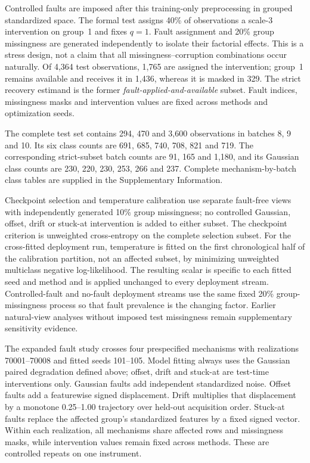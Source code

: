 \documentclass[11pt]{article}
\begin{document}
Controlled faults are imposed after this training-only preprocessing in grouped standardized space. The formal test assigns 40\% of observations a scale-3 intervention on group~1 and fixes $q=1$. Fault assignment and 20\% group missingness are generated independently to isolate their factorial effects. This is a stress design, not a claim that all missingness--corruption combinations occur naturally. Of 4,364 test observations, 1,765 are assigned the intervention; group~1 remains available and receives it in 1,436, whereas it is masked in 329. The strict recovery estimand is the former \emph{fault-applied-and-available} subset. Fault indices, missingness masks and intervention values are fixed across methods and optimization seeds.

The complete test set contains 294, 470 and 3,600 observations in batches 8, 9 and 10. Its six class counts are 691, 685, 740, 708, 821 and 719. The corresponding strict-subset batch counts are 91, 165 and 1,180, and its Gaussian class counts are 230, 220, 230, 253, 266 and 237. Complete mechanism-by-batch class tables are supplied in the Supplementary Information.

Checkpoint selection and temperature calibration use separate fault-free views with independently generated 10\% group missingness; no controlled Gaussian, offset, drift or stuck-at intervention is added to either subset. The checkpoint criterion is unweighted cross-entropy on the complete selection subset. For the cross-fitted deployment run, temperature is fitted on the first chronological half of the calibration partition, not an affected subset, by minimizing unweighted multiclass negative log-likelihood. The resulting scalar is specific to each fitted seed and method and is applied unchanged to every deployment stream. Controlled-fault and no-fault deployment streams use the same fixed 20\% group-missingness process so that fault prevalence is the changing factor. Earlier natural-view analyses without imposed test missingness remain supplementary sensitivity evidence.

The expanded fault study crosses four prespecified mechanisms with realizations 70001--70008 and fitted seeds 101--105. Model fitting always uses the Gaussian paired degradation defined above; offset, drift and stuck-at are test-time interventions only. Gaussian faults add independent standardized noise. Offset faults add a featurewise signed displacement. Drift multiplies that displacement by a monotone 0.25--1.00 trajectory over held-out acquisition order. Stuck-at faults replace the affected group's standardized features by a fixed signed vector. Within each realization, all mechanisms share affected rows and missingness masks, while intervention values remain fixed across methods. These are controlled repeats on one instrument.
\end{document}
